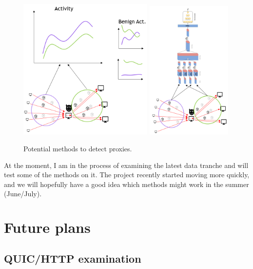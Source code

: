 \documentclass[a4paper,12pt,twoside]{article}
\begin{document}
\begin{figure}
\centering
\includegraphics[width=0.6\textwidth]{images/Proxy1.png}
\includegraphics[width=0.38\textwidth]{images/Proxy2}
\caption{Potential methods to detect proxies.}
\label{fig:Proxy}
\end{figure}

At the moment, I am in the process of examining the latest data tranche and will test some of the methods on it. The project recently started moving more quickly, and we will hopefully have a good idea which methods might work in the summer (June/July).

\section{Future plans}

\subsection{QUIC/HTTP examination}
\end{document}
